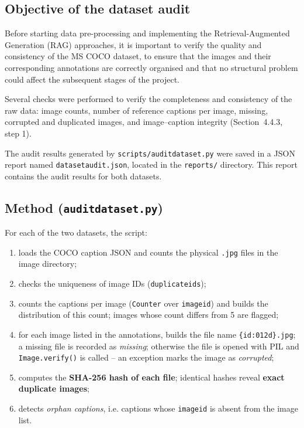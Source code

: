 \documentclass[11pt,a4paper]{article}
\renewcommand{\_}{\textunderscore\allowbreak{}}
\newcommand{\code}[1]{\texttt{#1}}
\begin{document}
\subsection{Objective of the dataset audit}

Before starting data pre-processing and implementing the Retrieval-Augmented Generation (RAG) approaches, it is important to verify the quality and consistency of the MS COCO dataset, to ensure that the images and their corresponding annotations are correctly organised and that no structural problem could affect the subsequent stages of the project.

Several checks were performed to verify the completeness and consistency of the raw data: image counts, number of reference captions per image, missing, corrupted and duplicated images, and image--caption integrity (Section~4.4.3, step 1).

The audit results generated by \code{scripts/audit\_dataset.py} were saved in a JSON report named \code{dataset\_audit.json}, located in the \code{reports/} directory. This report contains the audit results for both datasets.


\subsection{Method (\code{audit\_dataset.py})}
For each of the two datasets, the script:
\begin{enumerate}[nosep]
  \item loads the COCO caption JSON and counts the physical \code{.jpg} files in the image directory;
  \item checks the uniqueness of image IDs (\code{duplicate\_ids});
  \item counts the captions per image (\code{Counter} over \code{image\_id}) and builds the distribution of this count; images whose count differs from 5 are flagged;
  \item for each image listed in the annotations, builds the file name \code{\{id:012d\}.jpg}; a missing file is recorded as \emph{missing}; otherwise the file is opened with PIL and \code{Image.verify()} is called -- an exception marks the image as \emph{corrupted};
  \item computes the \textbf{SHA-256 hash of each file}; identical hashes reveal \textbf{exact duplicate images};
  \item detects \emph{orphan captions}, i.e. captions whose \code{image\_id} is absent from the image list.
\end{enumerate}
\end{document}
